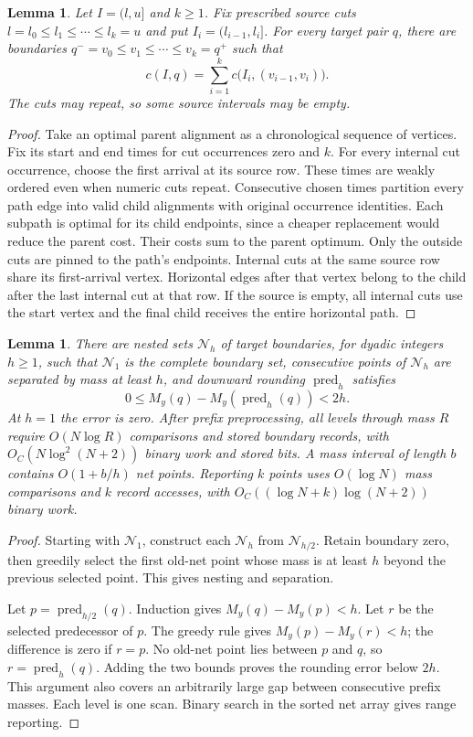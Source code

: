 \documentclass[11pt]{article}
\newtheorem{lemma}[theorem]{Lemma}
\theoremstyle{definition}
\newcommand{\1}{\mathbf 1}
\begin{document}
\begin{lemma}\label{refine:lem:ordered-splitting}
Let $I=(l,u]$ and $k\ge1$. Fix prescribed source cuts
$l=l_0\le l_1\le\cdots\le l_k=u$ and put $I_i=(l_{i-1},l_i]$.
For every target pair $q$, there are boundaries
$q^-=v_0\le v_1\le\cdots\le v_k=q^+$ such that
\[
 c(I,q)=\sum_{i=1}^k c\bigl(I_i,(v_{i-1},v_i)\bigr).
\]
The cuts may repeat, so some source intervals may be empty.
\end{lemma}
\begin{proof}
Take an optimal parent alignment as a chronological sequence of vertices.
Fix its start and end times for cut occurrences zero and $k$.
For every internal cut occurrence, choose the first arrival at its source
row. These times are weakly ordered even when numeric cuts repeat.
Consecutive chosen times partition every path edge into valid child
alignments with original occurrence identities. Each subpath is optimal
for its child endpoints, since a cheaper replacement would reduce the
parent cost. Their costs sum to the parent optimum.
Only the outside cuts are pinned to the path's endpoints. Internal cuts
at the same source row share its first-arrival vertex. Horizontal edges
after that vertex belong to the child after the last internal cut at
that row. If the source is empty, all internal cuts use the start
vertex and the final child receives the entire horizontal path.
\end{proof}

\begin{lemma}\label{refine:lem:nets}
There are nested sets $\mathcal N_h$ of target boundaries, for dyadic integers $h\ge1$, such that $\mathcal N_1$ is the complete boundary set, consecutive points of $\mathcal N_h$ are separated by mass at least $h$, and downward rounding $\operatorname{pred}_h$ satisfies
\[
 0\le M_y(q)-M_y(\operatorname{pred}_h(q))<2h.
\]
At $h=1$ the error is zero.
After prefix preprocessing, all levels through mass $R$ require
$O(N\log R)$ comparisons and stored boundary records, with
$O_C(N\log^2(N+2))$ binary work and stored bits.
A mass interval of length $b$ contains $O(1+b/h)$ net points.
Reporting $k$ points uses $O(\log N)$ mass comparisons and $k$ record
accesses, with $O_C((\log N+k)\log(N+2))$ binary work.
\end{lemma}
\begin{proof}
Starting with $\mathcal N_1$, construct each $\mathcal N_h$ from
$\mathcal N_{h/2}$.
Retain boundary zero, then greedily select the first old-net point whose
mass is at least $h$ beyond the previous selected point.
This gives nesting and separation.

Let $p=\operatorname{pred}_{h/2}(q)$.
Induction gives $M_y(q)-M_y(p)<h$.
Let $r$ be the selected predecessor of $p$.
The greedy rule gives $M_y(p)-M_y(r)<h$; the difference is zero if $r=p$.
No old-net point lies between $p$ and $q$, so
$r=\operatorname{pred}_h(q)$.
Adding the two bounds proves the rounding error below $2h$.
This argument also covers an arbitrarily large gap between consecutive
prefix masses.
Each level is one scan. Binary search in the sorted net array gives
range reporting.
\end{proof}
\end{document}
